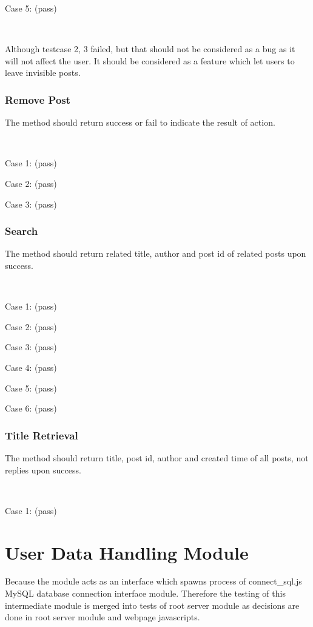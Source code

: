 Case 5: (pass)


~

Although testcase 2, 3 failed, but that should not be considered as a bug as it will not affect the user. It should be considered as a feature which let users to leave invisible posts.

\subsubsection{Remove Post}
The method should return success or fail to indicate the result of action.

~

Case 1: (pass)


Case 2: (pass)


Case 3: (pass)


\subsubsection{Search}
The method should return related title, author and post id of related posts upon success.

~

Case 1: (pass)


Case 2: (pass)


Case 3: (pass)


Case 4: (pass)


Case 5: (pass)


Case 6: (pass)


\subsubsection{Title Retrieval}
The method should return title, post id, author and created time of all posts, not replies upon success.

~

Case 1: (pass)


\section{User Data Handling Module}
Because the module acts as an interface which spawns process of connect\_sql.js MySQL database connection interface module. Therefore the testing of this intermediate module is merged into tests of root server module as decisions are done in root server module and webpage javascripts.

